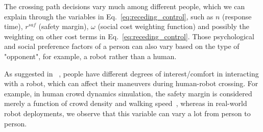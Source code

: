 \documentclass[conference]{IEEEtran}
\begin{document}




The crossing path decisions vary much among different people, 
which we can explain through the variables in Eq.~\ref{eq:receding_control}, such as 
$n$ (response time), $r^{saf}$ (safety margin), $\omega$ (social cost 
weighting function)
and possibly the weighting on other cost terms in Eq.~\ref{eq:receding_control}. 
Those psychological 
and social preference factors of a person can also vary based on the type of "opponent", for example, a robot rather than a human.

As suggested in ~\cite{hansen2009adaptive},
people have different degrees of interest/comfort in interacting with a robot, which 
can affect their maneuvers during human-robot crossing. For 
example, in human crowd dynamics simulation, the safety margin is considered 
merely a function of crowd density and walking speed~\cite{helbing1995social},
whereas in real-world robot deployments, we observe that this variable can vary a lot from person to person.
\end{document}
